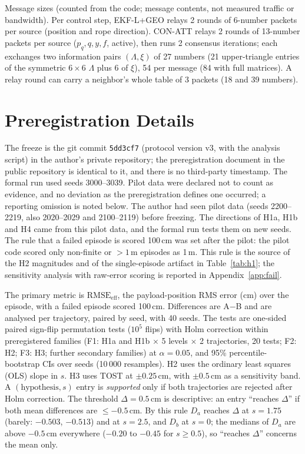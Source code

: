\documentclass[conference]{IEEEtran}
\begin{document}
Message sizes (counted from the code; message contents, not measured traffic or bandwidth). Per control step, EKF-L+GEO relays 2 rounds of 6-number packets per source (position and rope direction). CON-ATT relays 2 rounds of 13-number packets per source ($p_q,q,y,f$, active), then runs 2 consensus iterations; each exchanges two information pairs $(\Lambda,\xi)$ of 27 numbers (21 upper-triangle entries of the symmetric $6{\times}6$ $\Lambda$ plus 6 of $\xi$), 54 per message (84 with full matrices). A relay round can carry a neighbor's whole table of 3 packets (18 and 39 numbers).

\section{Preregistration Details}\label{app:prereg}
The freeze is the git commit \texttt{5dd3cf7} (protocol version v3, with the analysis script) in the author's private repository; the preregistration document in the public repository is identical to it, and there is no third-party timestamp. The formal run used seeds 3000--3039. Pilot data were declared not to count as evidence, and no deviation as the preregistration defines one occurred; a reporting omission is noted below. The author had seen pilot data (seeds 2200--2219, also 2020--2029 and 2100--2119) before freezing. The directions of H1a, H1b and H4 came from this pilot data, and the formal run tests them on new seeds. The rule that a failed episode is scored 100\,cm was set after the pilot: the pilot code scored only non-finite or $>1$\,m episodes as 1\,m. This rule is the source of the H2 magnitudes and of the single-episode artifact in Table~\ref{tab:h1}; the sensitivity analysis with raw-error scoring is reported in Appendix~\ref{app:fail}.

The primary metric is $\mathrm{RMSE}_\text{eff}$, the payload-position RMS error (cm) over the episode, with a failed episode scored 100\,cm. Differences are A$-$B and are analysed per trajectory, paired by seed, with 40 seeds. The tests are one-sided paired sign-flip permutation tests ($10^5$ flips) with Holm correction within preregistered families (F1: H1a and H1b $\times$ 5 levels $\times$ 2 trajectories, 20 tests; F2: H2; F3: H3; further secondary families) at $\alpha=0.05$, and 95\% percentile-bootstrap CIs over seeds (10\,000 resamples). H2 uses the ordinary least squares (OLS) slope in $s$. H3 uses TOST at $\pm0.25$\,cm, with $\pm0.5$\,cm as a sensitivity band. A $(\text{hypothesis},s)$ entry is \emph{supported} only if both trajectories are rejected after Holm correction. The threshold $\Delta=0.5$\,cm is descriptive: an entry ``reaches $\Delta$'' if both mean differences are $\le-0.5$\,cm. By this rule $D_a$ reaches $\Delta$ at $s=1.75$ (barely: $-0.503$, $-0.513$) and at $s=2.5$, and $D_b$ at $s=0$; the medians of $D_a$ are above $-0.5$\,cm everywhere ($-0.20$ to $-0.45$ for $s\ge0.5$), so ``reaches $\Delta$'' concerns the mean only.
\end{document}

